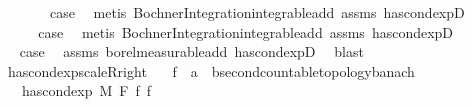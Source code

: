 \begin{isabellebody}
\ {}\isanewline
\ \ \isamarkupfalse%
\ \isamarkupfalse%
\ {\isacharquery}{\kern0pt}case\ \isamarkupfalse%
\ {\isacharparenleft}{\kern0pt}metis\ Bochner{\isacharunderscore}{\kern0pt}Integration{\isachardot}{\kern0pt}integrable{\isacharunderscore}{\kern0pt}add\ assms\ has{\isacharunderscore}{\kern0pt}cond{\isacharunderscore}{\kern0pt}expD{\isacharparenleft}{\kern0pt}{}{\isacharparenright}{\kern0pt}{\isacharparenright}{\kern0pt}\isanewline
{}\isamarkupfalse%
\isanewline
\ \ \isamarkupfalse%
\ {}\isanewline
\ \ \isamarkupfalse%
\ \isamarkupfalse%
\ {\isacharquery}{\kern0pt}case\ \isamarkupfalse%
\ {\isacharparenleft}{\kern0pt}metis\ Bochner{\isacharunderscore}{\kern0pt}Integration{\isachardot}{\kern0pt}integrable{\isacharunderscore}{\kern0pt}add\ assms\ has{\isacharunderscore}{\kern0pt}cond{\isacharunderscore}{\kern0pt}expD{\isacharparenleft}{\kern0pt}{}{\isacharparenright}{\kern0pt}{\isacharparenright}{\kern0pt}\isanewline
{}\isamarkupfalse%
\isanewline
\ \ \isamarkupfalse%
\ {}\isanewline
\ \ \isamarkupfalse%
\ \isamarkupfalse%
\ {\isacharquery}{\kern0pt}case\ \isamarkupfalse%
\ assms\ borel{\isacharunderscore}{\kern0pt}measurable{\isacharunderscore}{\kern0pt}add\ has{\isacharunderscore}{\kern0pt}cond{\isacharunderscore}{\kern0pt}expD{\isacharparenleft}{\kern0pt}{}{\isacharparenright}{\kern0pt}\ \isamarkupfalse%
\ blast\isanewline
{}\isamarkupfalse%
%
\endisatagproof
{\isafoldproof}%
%
\isadelimproof
\isanewline
%
\endisadelimproof
\isanewline
{}\isamarkupfalse%
\ has{\isacharunderscore}{\kern0pt}cond{\isacharunderscore}{\kern0pt}exp{\isacharunderscore}{\kern0pt}scaleR{\isacharunderscore}{\kern0pt}right{\isacharcolon}{\kern0pt}\isanewline
\ \ \ f\ {\isacharcolon}{\kern0pt}{\isacharcolon}{\kern0pt}\ {\isachardoublequoteopen}{\isacharprime}{\kern0pt}a\ {\isasymRightarrow}\ {\isacharprime}{\kern0pt}b{\isacharcolon}{\kern0pt}{\isacharcolon}{\kern0pt}{\isacharbraceleft}{\kern0pt}second{\isacharunderscore}{\kern0pt}countable{\isacharunderscore}{\kern0pt}topology{\isacharcomma}{\kern0pt}banach{\isacharbraceright}{\kern0pt}{\isachardoublequoteclose}\isanewline
\ \ \ {\isachardoublequoteopen}has{\isacharunderscore}{\kern0pt}cond{\isacharunderscore}{\kern0pt}exp\ M\ F\ f\ f{\isacharprime}{\kern0pt}{\isachardoublequoteclose}\isanewline

\end{isabellebody}
